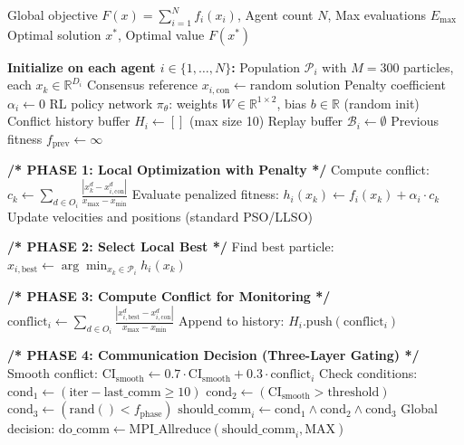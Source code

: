 \documentclass[11pt,a4paper]{article}
\begin{document}
\begin{algorithm}
\caption{MACPO with RL-based Adaptive Penalty}
\begin{algorithmic}[1]
\Require Global objective $F(x) = \sum_{i=1}^N f_i(x_i)$, Agent count $N$, Max evaluations $E_{\max}$
\Ensure Optimal solution $x^*$, Optimal value $F(x^*)$

\State \textbf{Initialize on each agent $i \in \{1, \ldots, N\}$:}
\State \quad Population $\mathcal{P}_i$ with $M=300$ particles, each $x_k \in \mathbb{R}^{D_i}$
\State \quad Consensus reference $x_{i,\text{con}} \gets \text{random solution}$
\State \quad Penalty coefficient $\alpha_i \gets 0$ 
\State \quad RL policy network $\pi_\theta$: weights $W \in \mathbb{R}^{1 \times 2}$, bias $b \in \mathbb{R}$ (random init)
\State \quad Conflict history buffer $H_i \gets []$ (max size 10)
\State \quad Replay buffer $\mathcal{B}_i \gets \emptyset$
\State \quad Previous fitness $f_{\text{prev}} \gets \infty$

    \State \textbf{/* PHASE 1: Local Optimization with Penalty */}
            \State Compute conflict: $c_k \gets \sum_{d \in O_i} \frac{|x_k^d - x_{i,\text{con}}^d|}{x_{\max} - x_{\min}}$
            \State Evaluate penalized fitness: $h_i(x_k) \gets f_i(x_k) + \alpha_i \cdot c_k$
        \EndFor
        \State Update velocities and positions (standard PSO/LLSO)
    \EndFor
    
    \State \textbf{/* PHASE 2: Select Local Best */}
    \State Find best particle: $x_{i,\text{best}} \gets \arg\min_{x_k \in \mathcal{P}_i} h_i(x_k)$
    
    \State \textbf{/* PHASE 3: Compute Conflict for Monitoring */}
    \State $\text{conflict}_i \gets \sum_{d \in O_i} \frac{|x_{i,\text{best}}^d - x_{i,\text{con}}^d|}{x_{\max} - x_{\min}}$
    \State Append to history: $H_i.\text{push}(\text{conflict}_i)$
    
    \State \textbf{/* PHASE 4: Communication Decision (Three-Layer Gating) */}
    \State Smooth conflict: $\text{CI}_{\text{smooth}} \gets 0.7 \cdot \text{CI}_{\text{smooth}} + 0.3 \cdot \text{conflict}_i$
    \State Check conditions:
    \State \quad $\text{cond}_1 \gets (\text{iter} - \text{last\_comm} \geq 10)$ 
    \State \quad $\text{cond}_2 \gets (\text{CI}_{\text{smooth}} > \text{threshold})$ 
    \State \quad $\text{cond}_3 \gets (\text{rand}() < f_{\text{phase}})$ 
    \State $\text{should\_comm}_i \gets \text{cond}_1 \land \text{cond}_2 \land \text{cond}_3$
    \State Global decision: $\text{do\_comm} \gets \text{MPI\_Allreduce}(\text{should\_comm}_i, \text{MAX})$
    

\end{algorithmic}
\end{algorithm}
\end{document}
